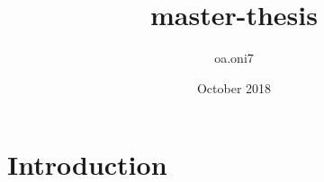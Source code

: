 \documentclass{article}
\title{master-thesis}
\author{oa.oni7 }
\date{October 2018}
\begin{document}
\maketitle

\section{Introduction}
\end{document}
